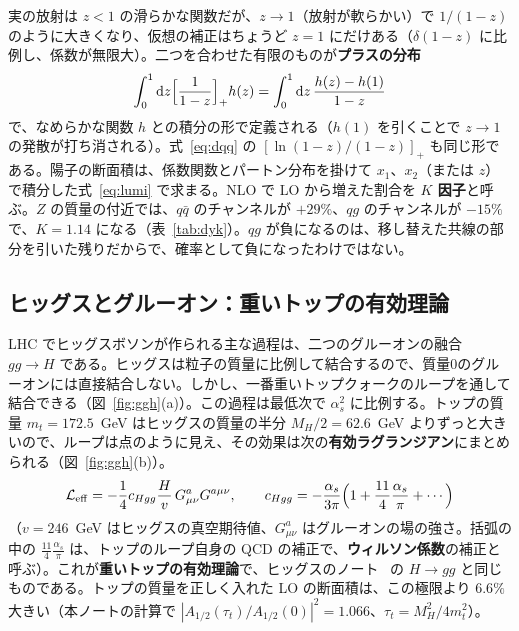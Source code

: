 \documentclass[a4paper,10pt]{ltjsarticle}
\newcommand{\dd}{\mathrm{d}}
\begin{document}
実の放射は $z<1$ の滑らかな関数だが、$z\to1$（放射が軟らかい）で $1/(1-z)$ のように大きくなり、仮想の補正はちょうど $z=1$ にだけある（$\delta(1-z)$ に比例し、係数が無限大）。二つを合わせた有限のものが\textbf{プラスの分布}
\[
\int_0^1\dd z\Bigl[\frac1{1-z}\Bigr]_+h(z)=\int_0^1\dd z\,\frac{h(z)-h(1)}{1-z}
\]
で、なめらかな関数 $h$ との積分の形で定義される（$h(1)$ を引くことで $z\to1$ の発散が打ち消される）。式~\eqref{eq:dqq} の $[\ln(1-z)/(1-z)]_+$ も同じ形である。陽子の断面積は、係数関数とパートン分布を掛けて $x_1$、$x_2$（または $z$）で積分した式~\eqref{eq:lumi} で求まる。NLO で LO から増えた割合を \textbf{$K$ 因子}と呼ぶ。$Z$ の質量の付近では、$q\bar q$ のチャンネルが $+29\%$、$qg$ のチャンネルが $-15\%$ で、$K=1.14$ になる（表~\ref{tab:dyk}）。$qg$ が負になるのは、移し替えた共線の部分を引いた残りだからで、確率として負になったわけではない。

\subsection{ヒッグスとグルーオン：重いトップの有効理論}\label{sec:heftintro}

LHC でヒッグスボソンが作られる主な過程は、二つのグルーオンの融合 $gg\to H$ である。ヒッグスは粒子の質量に比例して結合するので、質量0のグルーオンには直接結合しない。しかし、一番重いトップクォークのループを通して結合できる（図~\ref{fig:ggh}(a)）。この過程は最低次で $\alpha_s^2$ に比例する。トップの質量 $m_t=172.5$~GeV はヒッグスの質量の半分 $M_H/2=62.6$~GeV よりずっと大きいので、ループは点のように見え、その効果は次の\textbf{有効ラグランジアン}にまとめられる（図~\ref{fig:ggh}(b)）。
\[
\mathcal L_{\mathrm{eff}}=-\frac14c_{Hgg}\frac Hv\,G^a_{\mu\nu}G^{a\mu\nu},\qquad c_{Hgg}=-\frac{\alpha_s}{3\pi}\Bigl(1+\frac{11}4\frac{\alpha_s}\pi+\cdots\Bigr)
\]
（$v=246$~GeV はヒッグスの真空期待値、$G^a_{\mu\nu}$ はグルーオンの場の強さ。括弧の中の $\frac{11}4\frac{\alpha_s}\pi$ は、トップのループ自身の QCD の補正で、\textbf{ウィルソン係数}の補正と呼ぶ）。これが\textbf{重いトップの有効理論}で、ヒッグスのノート~\cite{higgsnote} の $H\to gg$ と同じものである。トップの質量を正しく入れた LO の断面積は、この極限より $6.6\%$ 大きい（本ノートの計算で $|A_{1/2}(\tau_t)/A_{1/2}(0)|^2=1.066$、$\tau_t=M_H^2/4m_t^2$）。
\end{document}
